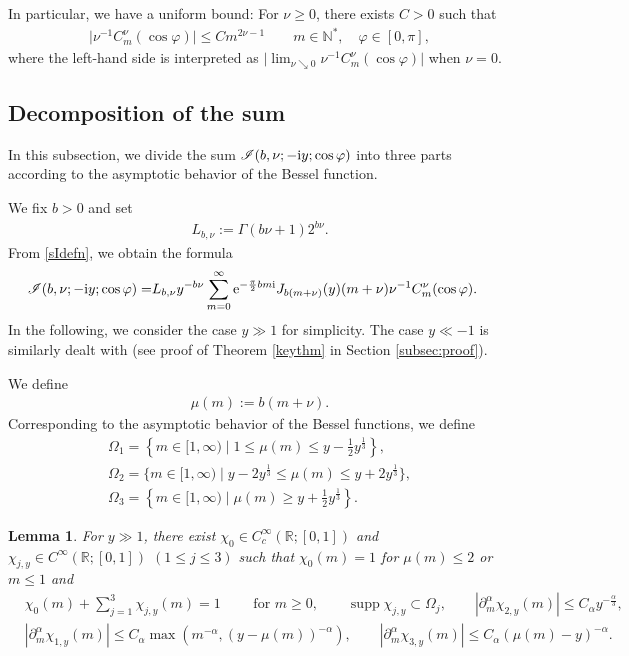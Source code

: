 \documentclass[10pt,a4paper]{amsart}
\numberwithin{equation}{section}
\newtheorem{Lemma}[Theorem]{Lemma}
\def\R{\mathbb{R}}%
\DeclareMathOperator{\supp}{supp}%
\def\a{\alpha}
\def\f{\varphi}
\def\m{\mu}
\def\n{\nu}
\def\pa{\partial}
\newcommand{\sI}{\mathscr{I}}
\begin{document}
In particular, we have a uniform bound: For $\n\geq 0$, there exists $C>0$ such that
\begin{align}\label{Gegenunif}
\big|\n^{-1}C_m^{\n}(\cos \f)\big|\leq Cm^{2\n-1}\qquad m\in \mathbb{N}^*,\quad \f\in[0,\pi],
\end{align}
where the left-hand side is interpreted as $\big|\lim_{\n\searrow 0}\n^{-1}C_m^{\n}(\cos \f)\big|$ when $\n=0$.

\subsection{Decomposition of the sum}\label{subsecdecom}

In this subsection, we divide the sum $\sI(b,\nu;- {\rm i}y;\cos\f)$ into three parts according to the asymptotic behavior of the Bessel function.

We fix $b>0$ and set
\begin{align}\label{cbndef}
L_{b,\n}:=\Gamma(b\nu+1)2^{b\n}.
\end{align}
From \eqref{sIdefn}, we obtain the formula
\begin{align}\label{sumbesell}
\sI(b,\nu;- {\rm i}y;\cos\f)=&L_{b,\n}y^{-b\n}\sum_{m=0}^{\infty}{\rm e}^{-\frac{\pi}{2}bm{\rm i}}J_{b(m+\n)}(y)(m+\nu)\n^{-1}C^{\nu}_m(\cos\f).
\end{align}
In the following, we consider the case $y\gg 1$ for simplicity. The case $y\ll -1$ is similarly dealt with (see proof of Theorem \ref{keythm} in Section \ref{subsec:proof}).






We define
\begin{align}\label{muemudef}
\m(m):=b(m+\n).
\end{align}
Corresponding to the asymptotic behavior of the Bessel functions, we define
\begin{gather*}
\Omega_1=\left\{m\in[1,\infty)\mid 1\leq \m(m)\leq y-\frac{1}{2}y^{\frac{1}{3}}\right\},\\ \Omega_2=\big\{m\in[1,\infty)\mid y-2y^{\frac{1}{3}}\leq \m(m)\leq y+2y^{\frac{1}{3}}\big\},\\
\Omega_3=\left\{m\in[1,\infty)\mid \m(m)\geq y+\frac{1}{2}y^{\frac{1}{3}}\right\}.
\end{gather*}

\begin{Lemma}\label{Cutoff}
For $y\gg 1$,
there exist $\chi_0\in C_c^{\infty}(\R;[0,1])$ and $\chi_{j,y}\in C^{\infty}(\R;[0,1])$ $(1\le j\le 3)$ such that $\chi_0(m)=1$ for $\m(m)\leq 2$ or $m\leq 1$ and
\begin{align}
&\chi_0(m)+\sum_{j=1}^3\chi_{j,y}(m)=1\qquad \text{ for $m\geq 0$},\qquad \supp \chi_{j,y}\subset \Omega_j,\qquad |\pa_m^{\a}\chi_{2,y}(m)|\leq C_{\a}y^{-\frac{\a}{3}},\nonumber\\
&|\pa_m^{\a}\chi_{1,y}(m)|\leq C_{\a}\max(m^{-\a}, (y-\m(m))^{-\a}),\qquad |\pa_m^{\a}\chi_{3,y}(m)|\leq C_{\a}(\m(m)-y)^{-\a}\label{POUproper}.
\end{align}
\end{Lemma}
\end{document}
